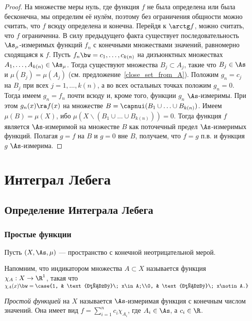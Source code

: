 \documentclass[10pt]{article}
\begin{document}
\begin{proof}
На множестве меры нуль, где функция $f$ не была определена или была
бесконечна, мы определим её нулём, поэтому без ограничения общности
можно считать, что $f$ всюду определена и конечна. Перейдя к $\arctg
f$, можно считать, что $f$ ограниченна. В силу предыдущего факта
существует последовательность $\As_\mu$-измеримых функций $f_n$ с
конечными множествами значений, равномерно сходящаяся к $f$. Пусть
$f_n\bw =c_1,\ldots,c_{k(n)}$ на дизъюнктных множествах
$A_1,\ldots,A_{k(n)}\in\As_\mu$. Тогда существуют множества
$B_j\subset A_j$, такие что $B_j\in\As$ и $\mu(B_j)=\mu(A_j)$ (см.
предложение~\ref{close_set_from_A}). Положим $g_n=c_j$ на $B_j$ при
всех $j=1,\ldots,k(n)$, а во всех остальных точках положим $g_n=0$.
Тогда имеем $g_n=f_n$ почти всюду и, кроме того, функции $g_n$
$\As$-измеримы. При этом $g_n(x)\ra f(x)$ на множестве
$B=\capnui(B_1\cup\ldots\cup B_{k(n)})$. Имеем $\mu(B)=\mu(X)$, ибо
$\mu(X\backslash (B_1\cup\ldots\cup B_{k(n)}))=0$. Тогда функция $f$
является $\As$-измеримой на множестве $B$ как поточечный предел
$\As$-измеримых функций. Полагая $g=f$ на $B$ и $g=0$ вне $B$,
получаем, что $f=g$ п.в. и функция $g$ $\As$-измерима.
\end{proof}


\section{Интеграл Лебега}

\subsection{Определение Интеграла Лебега}
\subsubsection{Простые функции}

Пусть $(X,\As,\mu)$ --- пространство с конечной неотрицательной
мерой.

Напомним, что индикатором множества $A\subset X$ называется функция
$\chi_A: X \to \R^1$, такая что $\chi_A(x)\bw =\case{1, &
\text{если}\; x\in A;\\0, & \text{если}\; x\notin A.}$

\begin{df}
\emph{Простой функцией} на $X$ называется $\As$-измеримая функция с
конечным числом значений. Она имеет вид
$f=\sum\limits_{i=1}^nc_i\chi_{A_i}$, где $A_i\in\As$, а $c_i\in\R$.
\end{df}
\end{document}
